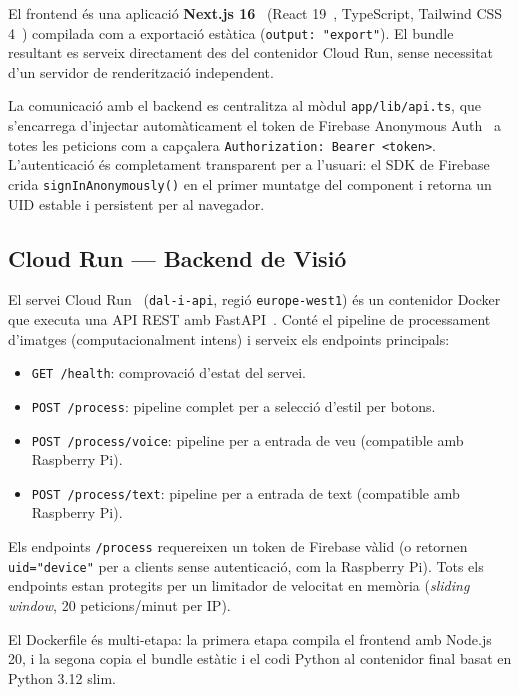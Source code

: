 El frontend és una aplicació \textbf{Next.js 16}~\cite{nextjs} (React 19~\cite{react}, TypeScript, Tailwind CSS 4~\cite{tailwind}) compilada com a exportació estàtica (\texttt{output: "export"}). El bundle resultant es serveix directament des del contenidor Cloud Run, sense necessitat d'un servidor de renderització independent.

La comunicació amb el backend es centralitza al mòdul \texttt{app/lib/api.ts}, que s'encarrega d'injectar automàticament el token de Firebase Anonymous Auth~\cite{firebase} a totes les peticions com a capçalera \texttt{Authorization: Bearer <token>}. L'autenticació és completament transparent per a l'usuari: el SDK de Firebase crida \texttt{signInAnonymously()} en el primer muntatge del component i retorna un UID estable i persistent per al navegador.

\subsection{Cloud Run — Backend de Visió}

El servei Cloud Run~\cite{cloudrun} (\texttt{dal-i-api}, regió \texttt{europe-west1}) és un contenidor Docker que executa una API REST amb FastAPI~\cite{fastapi}. Conté el pipeline de processament d'imatges (computacionalment intens) i serveix els endpoints principals:

\begin{itemize}
  \item \texttt{GET /health}: comprovació d'estat del servei.
  \item \texttt{POST /process}: pipeline complet per a selecció d'estil per botons.
  \item \texttt{POST /process/voice}: pipeline per a entrada de veu (compatible amb Raspberry Pi).
  \item \texttt{POST /process/text}: pipeline per a entrada de text (compatible amb Raspberry Pi).
\end{itemize}

Els endpoints \texttt{/process} requereixen un token de Firebase vàlid (o retornen \texttt{uid="device"} per a clients sense autenticació, com la Raspberry Pi). Tots els endpoints estan protegits per un limitador de velocitat en memòria (\textit{sliding window}, 20 peticions/minut per IP).

El Dockerfile és multi-etapa: la primera etapa compila el frontend amb Node.js 20, i la segona copia el bundle estàtic i el codi Python al contenidor final basat en Python 3.12 slim.

